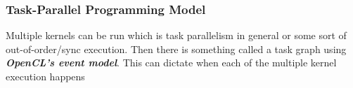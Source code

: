 \documentclass[10pt]{article}
\begin{document}
\subsubsection{Task-Parallel Programming Model}
Multiple kernels can be run which is task parallelism in general or some sort of out-of-order/sync execution. Then there is something called a task graph using \textit{\textbf{OpenCL's event model}}. This can dictate when each of the multiple kernel execution happens
\end{document}
